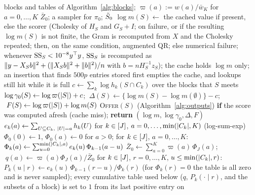 \begin{algorithm}
\caption{Stage~3: model evaluation, the start law $\pi_0$ with its exact sampler, and the start mode $\tSz$.}\label{alg:start}
{\footnotesize
\begin{algorithmic}[1]
\Require blocks and tables of Algorithm~\ref{alg:blocks}; $\varpi(a):=w(a)/\bar w_K$ for $a=0,\dots,K$
\Ensure $\bar Z_0$; a sampler for $\pi_0$; $\tSz$
\State $\log m(S)\gets$ the cached value if present, else the scorer (Cholesky of $H_S$ and $G_S+I$; on failure, or if the resulting $\log m(S)$ is not finite, the Gram is recomputed from $X$ and the Cholesky repeated; then, on the same condition, augmented QR; else numerical failure; whenever $\mathrm{SS}_S<10^{-8}y^\top y$, $\mathrm{SS}_S$ is recomputed as $\lVert y-X_Sb\rVert^2+(\lVert X_Sb\rVert^2+\lVert b\rVert^2)/n$ with $b=nH_S^{-1}z_S$); the cache holds $\log m$ only; an insertion that finds $500p$ entries stored first empties the cache, and lookups still hit while it is full %
\State $c\gets\sum_k\log h_k(S\cap C_k)$ over the blocks that $S$ meets %
\State $\log\gamma_0(S)\gets\log\varpi(\lvert S\rvert)+c$; $\ \Delta(S)\gets\{\log m(S)-\log m(\emptyset)\}-c$; $\ F(S)\gets\log\varpi(\lvert S\rvert)+\log m(S)$ %
\State \textsc{Offer}$(S)$ (Algorithm~\ref{alg:outputs}) \textbf{if} the score was computed afresh (cache miss); \textbf{return} $(\log m,\log\gamma_0,\Delta,F)$ %
\EndProcedure
{}
\State $e_k(a)\gets\sum_{U\subseteq C_k,\ \lvert U\rvert=a}h_k(U)$ for $k\in[J]$, $a=0,\dots,\min(\lvert C_k\rvert,K)$ (log-sum-exp) %
\State $\Phi_0(0)\gets1$, $\Phi_0(a)\gets0$ for $a>0$; for $k\in[J]$, $a=0,\dots,K$: $\Phi_k(a)\gets\sum_{u=0}^{\min(\lvert C_k\rvert,a)}e_k(u)\,\Phi_{k-1}(a-u)$ %
\State $\bar Z_0\gets\sum_{a=0}^{K}\varpi(a)\,\Phi_J(a)$; $\ q(a)\gets\varpi(a)\Phi_J(a)/\bar Z_0$ %
\State for $k\in[J]$, $r=0,\dots,K$, $u\le\min(\lvert C_k\rvert,r)$: $P_k(u\mid r)\gets e_k(u)\,\Phi_{k-1}(r-u)/\Phi_k(r)$ (for $\Phi_k(r)=0$ the table is all zero and is never sampled); every cumulative table used below ($q$, $P_k(\cdot\mid r)$, and the subsets of a block) is set to $1$ from its last positive entry on %
\EndProcedure
{}

\end{algorithmic}}
\end{algorithm}
